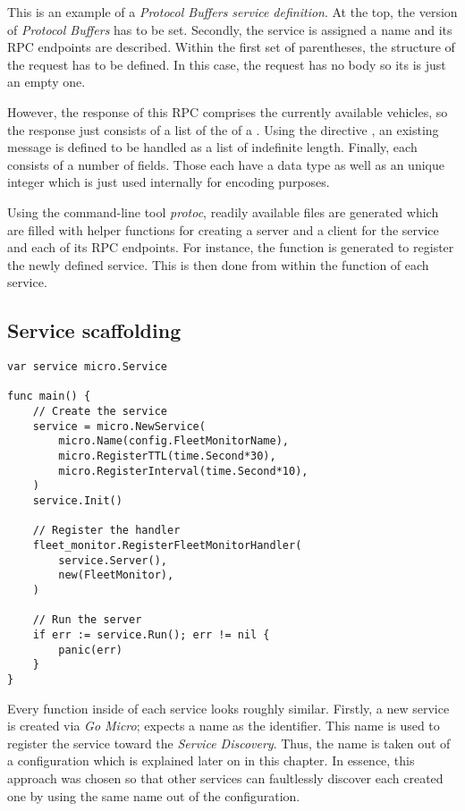 \documentclass[12pt,a4paper,twoside]{report}
\begin{document}
This is an example of a \textit{Protocol Buffers service definition}.
At the top, the version of \textit{Protocol Buffers} has to be set.
Secondly, the service is assigned a name and its RPC endpoints are described.
Within the first set of parentheses, the structure of the request has to be
defined. In this case, the request has no body so its  is just an
empty one.

However, the response of this RPC comprises the currently available vehicles,
so the response just consists of a list of the  of a .
Using the directive , an existing message is defined to be
handled as a list of indefinite length.
Finally, each  consists of a number of fields. Those each have
a data type as well as an unique integer which is just used internally for
encoding purposes.

Using the command-line tool \textit{protoc}, readily available  files
are generated which are filled with helper functions for creating
a server and a client for the service and each of its RPC endpoints.
For instance, the function  is generated
to register the newly defined service.
This is then done from within the  function of each service.

\subsection{Service scaffolding}

\begin{lstlisting}[title=services/fleet-monitor/main.go]
var service micro.Service

func main() {
	// Create the service
	service = micro.NewService(
		micro.Name(config.FleetMonitorName),
		micro.RegisterTTL(time.Second*30),
		micro.RegisterInterval(time.Second*10),
	)
	service.Init()

    // Register the handler
	fleet_monitor.RegisterFleetMonitorHandler(
		service.Server(),
		new(FleetMonitor),
	)

    // Run the server
	if err := service.Run(); err != nil {
		panic(err)
	}
}
\end{lstlisting}

Every  function inside of each service looks roughly similar.
Firstly, a new service is created via \textit{Go Micro};
 expects a name as the identifier.
This name is used to register the service toward the \textit{Service Discovery}.
Thus, the name is taken out of a configuration which is explained later on in
this chapter. In essence, this approach was chosen so that other services can
faultlessly discover each created one by using the same name out of the configuration.
\end{document}
